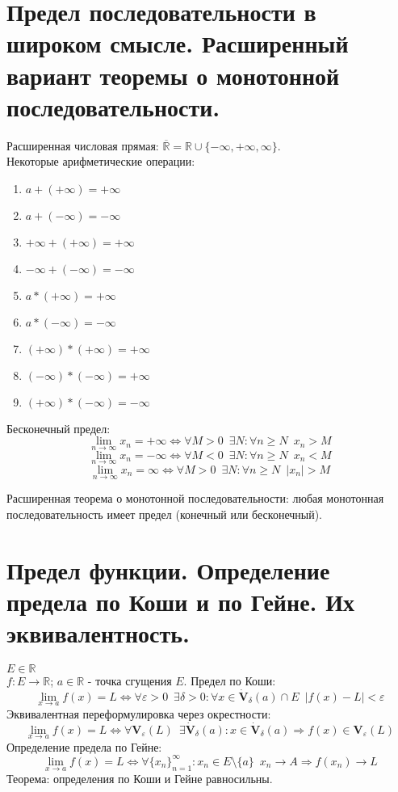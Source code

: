 \documentclass[11pt, a4paper]{article}
\def\R{\mathbb{R}}
\def\sp{\, \, \,}
\def\linf{\lim \limits_{n \to \infty}}
\def\lima{\lim \limits_{x \to a}}
\begin{document}
    \section{Предел последовательности в широком смысле. Расширенный вариант теоремы о монотонной последовательности.}
    Расширенная числовая прямая: $\overline{\R} = \R \cup \{-\infty, +\infty, \infty\}$.\\
    Некоторые арифметические операции:
    \begin{enumerate}
        \item $a + (+\infty) = +\infty$
        \item $a + (-\infty) = -\infty$
        \item $+\infty + (+\infty) = +\infty$
        \item $-\infty + (-\infty) = -\infty$
        \item $a * (+\infty) = +\infty$
        \item $a * (-\infty) = -\infty$
        \item $(+\infty)*(+\infty) = +\infty$
        \item $(-\infty)*(-\infty) = +\infty$
        \item $(+\infty)*(-\infty) = -\infty$
    \end{enumerate}

    Бесконечный предел:
    $$\linf x_n = +\infty \Leftrightarrow \forall M > 0 \sp \exists N: \forall n \geq N \sp x_n > M$$
    $$\linf x_n = -\infty \Leftrightarrow \forall M < 0 \sp \exists N: \forall n \geq N \sp x_n < M$$
    $$\linf x_n = \infty \Leftrightarrow \forall M > 0 \sp \exists N: \forall n \geq N \sp |x_n| > M$$

    Расширенная теорема о монотонной последовательности: любая монотонная последовательность имеет предел (конечный или бесконечный).

    \section{Предел функции. Определение предела по Коши и по Гейне. Их эквивалентность.}
    $E \in \R$\\
    $f: E \to \R$; $a \in \R$ - точка сгущения $E$. Предел по Коши:
    $$\lima f(x) = L \Leftrightarrow \forall \varepsilon > 0 \sp \exists \delta > 0 : \forall x \in \dot{\mathbf{V}}_{\delta}(a) \cap E \sp |f(x) - L| < \varepsilon$$
    Эквивалентная переформулировка через окрестности:
    $$\lima f(x) = L \Leftrightarrow \forall \mathbf{V}_{\varepsilon}(L) \sp \exists \dot{\mathbf{V}}_{\delta}(a) : x \in \dot{\mathbf{V}}_{\delta}(a) \Rightarrow f(x) \in \mathbf{V}_{\varepsilon}(L)$$
    Определение предела по Гейне:
    $$\lima f(x) = L \Leftrightarrow \forall \{x_n\}_{n = 1}^{\infty}: x_n \in E \setminus \{a\} \sp x_n \to A \Rightarrow f(x_n) \to L$$
    Теорема: определения по Коши и Гейне равносильны.
    
\end{document}
